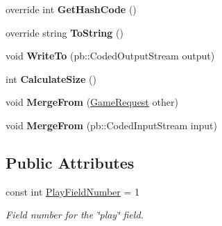 \begin{DoxyCompactItemize}
override int {\bfseries Get\+Hash\+Code} ()
\item 
\mbox{\label{class_jcoinche_1_1_google_1_1_protobuf_1_1_game_request_aaf9f7af7f132f0c0da8753433ec214a3}} 
override string {\bfseries To\+String} ()
\item 
\mbox{\label{class_jcoinche_1_1_google_1_1_protobuf_1_1_game_request_aab8e58d56d7280ae89eac51b6b3bda21}} 
void {\bfseries Write\+To} (pb\+::\+Coded\+Output\+Stream output)
\item 
\mbox{\label{class_jcoinche_1_1_google_1_1_protobuf_1_1_game_request_ae69cfebe4653b495f557006b64f0443f}} 
int {\bfseries Calculate\+Size} ()
\item 
\mbox{\label{class_jcoinche_1_1_google_1_1_protobuf_1_1_game_request_a5fd0dd24a239aee036fb1db4cd7d9b8f}} 
void {\bfseries Merge\+From} (\hyperlink{class_jcoinche_1_1_google_1_1_protobuf_1_1_game_request}{Game\+Request} other)
\item 
\mbox{\label{class_jcoinche_1_1_google_1_1_protobuf_1_1_game_request_a95b4ae00f94113b38126105b9e0a15a3}} 
void {\bfseries Merge\+From} (pb\+::\+Coded\+Input\+Stream input)
\end{DoxyCompactItemize}
\subsection*{Public Attributes}
\begin{DoxyCompactItemize}
\item 
const int \hyperlink{class_jcoinche_1_1_google_1_1_protobuf_1_1_game_request_a17f09b11e7126727cecc45c458ff09e3}{Play\+Field\+Number} = 1
\begin{DoxyCompactList}\small\item\em Field number for the \char`\"{}play\char`\"{} field.\end{DoxyCompactList}\end{DoxyCompactItemize}

